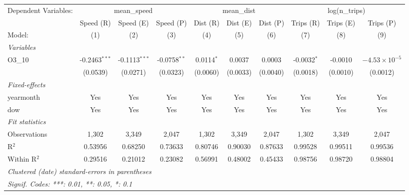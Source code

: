 \begingroup
\centering
\begin{tabular}{lccccccccc}
   \tabularnewline \midrule \midrule
   Dependent Variables: & \multicolumn{3}{c}{mean\_speed} & \multicolumn{3}{c}{mean\_dist} & \multicolumn{3}{c}{log(n\_trips)}\\
                & Speed (R)       & Speed (E)       & Speed (P)      & Dist (R)     & Dist (E) & Dist (P) & Trips (R)     & Trips (E) & Trips (P) \\   
   Model:       & (1)             & (2)             & (3)            & (4)          & (5)      & (6)      & (7)           & (8)       & (9)\\  
   \midrule
   \emph{Variables}\\
   O3\_10       & -0.2463$^{***}$ & -0.1113$^{***}$ & -0.0758$^{**}$ & 0.0114$^{*}$ & 0.0037   & 0.0003   & -0.0032$^{*}$ & -0.0010   & $-4.53\times 10^{-5}$\\    
                & (0.0539)        & (0.0271)        & (0.0323)       & (0.0060)     & (0.0033) & (0.0040) & (0.0018)      & (0.0010)  & (0.0012)\\   
   \midrule
   \emph{Fixed-effects}\\
   yearmonth    & Yes             & Yes             & Yes            & Yes          & Yes      & Yes      & Yes           & Yes       & Yes\\  
   dow          & Yes             & Yes             & Yes            & Yes          & Yes      & Yes      & Yes           & Yes       & Yes\\  
   \midrule
   \emph{Fit statistics}\\
   Observations & 1,302           & 3,349           & 2,047          & 1,302        & 3,349    & 2,047    & 1,302         & 3,349     & 2,047\\  
   R$^2$        & 0.53956         & 0.68250         & 0.73633        & 0.80746      & 0.90030  & 0.87633  & 0.99528       & 0.99511   & 0.99536\\  
   Within R$^2$ & 0.29516         & 0.21012         & 0.23082        & 0.56991      & 0.48002  & 0.45433  & 0.98756       & 0.98720   & 0.98804\\  
   \midrule \midrule
   \multicolumn{10}{l}{\emph{Clustered (date) standard-errors in parentheses}}\\
   \multicolumn{10}{l}{\emph{Signif. Codes: ***: 0.01, **: 0.05, *: 0.1}}\\
\end{tabular}
\par\endgroup
